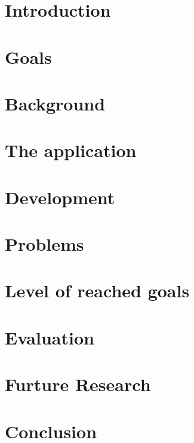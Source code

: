 \documentclass[a4paper,pt12]{article}
\begin{document}
\tableofcontents
\newpage

\section{Introduction}



\section{Goals}


\section{Background}


\section{The application}


\section{Development}


\section{Problems}


\section{Level of reached goals}


\section{Evaluation}


\section{Furture Research}


\section{Conclusion}


\newpage

%
%
\end{document}
